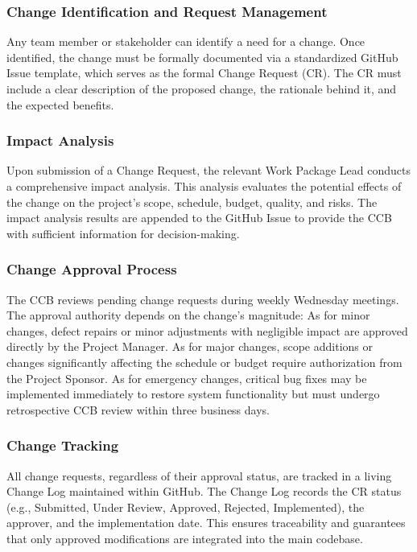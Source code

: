 \documentclass[12pt,a4paper]{article}
\begin{document}
\subsubsection{Change Identification and Request Management}
Any team member or stakeholder can identify a need for a change. Once identified, the change must be formally documented via a standardized GitHub Issue template, which serves as the formal Change Request (CR). The CR must include a clear description of the proposed change, the rationale behind it, and the expected benefits.

\subsubsection{Impact Analysis}
Upon submission of a Change Request, the relevant Work Package Lead conducts a comprehensive impact analysis. This analysis evaluates the potential effects of the change on the project's scope, schedule, budget, quality, and risks. The impact analysis results are appended to the GitHub Issue to provide the CCB with sufficient information for decision-making.

\subsubsection{Change Approval Process}
The CCB reviews pending change requests during weekly Wednesday meetings. The approval authority depends on the change's magnitude:
As for minor changes, defect repairs or minor adjustments with negligible impact are approved directly by the Project Manager.
As for major changes, scope additions or changes significantly affecting the schedule or budget require authorization from the Project Sponsor.
As for emergency changes, critical bug fixes may be implemented immediately to restore system functionality but must undergo retrospective CCB review within three business days.

\subsubsection{Change Tracking}
All change requests, regardless of their approval status, are tracked in a living Change Log maintained within GitHub. The Change Log records the CR status (e.g., Submitted, Under Review, Approved, Rejected, Implemented), the approver, and the implementation date. This ensures traceability and guarantees that only approved modifications are integrated into the main codebase.
\end{document}
